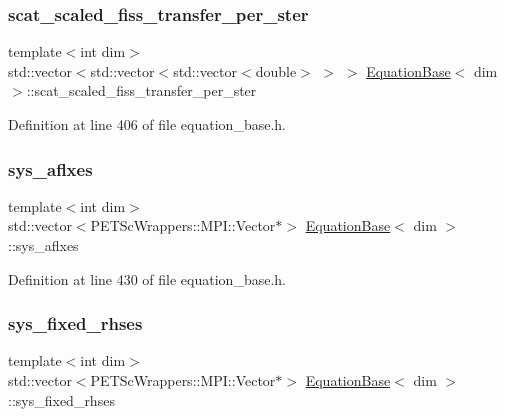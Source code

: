 \subsubsection{\texorpdfstring{scat\+\_\+scaled\+\_\+fiss\+\_\+transfer\+\_\+per\+\_\+ster}{scat\_scaled\_fiss\_transfer\_per\_ster}}
{\footnotesize\ttfamily template$<$int dim$>$ \\
std\+::vector$<$std\+::vector$<$std\+::vector$<$double$>$ $>$ $>$ \hyperlink{class_equation_base}{Equation\+Base}$<$ dim $>$\+::scat\+\_\+scaled\+\_\+fiss\+\_\+transfer\+\_\+per\+\_\+ster\hspace{0.3cm}{\ttfamily [protected]}}



Definition at line 406 of file equation\+\_\+base.\+h.

\mbox{\label{class_equation_base_afe48e9f1d2f6b4f13cefe80d43d18300}} 
\subsubsection{\texorpdfstring{sys\+\_\+aflxes}{sys\_aflxes}}
{\footnotesize\ttfamily template$<$int dim$>$ \\
std\+::vector$<$P\+E\+T\+Sc\+Wrappers\+::\+M\+P\+I\+::\+Vector$\ast$$>$ \hyperlink{class_equation_base}{Equation\+Base}$<$ dim $>$\+::sys\+\_\+aflxes\hspace{0.3cm}{\ttfamily [private]}}



Definition at line 430 of file equation\+\_\+base.\+h.

\mbox{\label{class_equation_base_a556e9d3b402dae0303e786e2ef38a29b}} 
\subsubsection{\texorpdfstring{sys\+\_\+fixed\+\_\+rhses}{sys\_fixed\_rhses}}
{\footnotesize\ttfamily template$<$int dim$>$ \\
std\+::vector$<$P\+E\+T\+Sc\+Wrappers\+::\+M\+P\+I\+::\+Vector$\ast$$>$ \hyperlink{class_equation_base}{Equation\+Base}$<$ dim $>$\+::sys\+\_\+fixed\+\_\+rhses\hspace{0.3cm}{\ttfamily [private]}}



